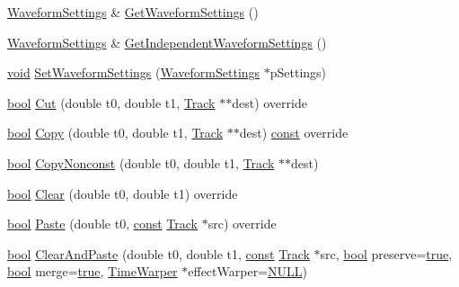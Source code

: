 \begin{DoxyCompactItemize}
\item 
\hyperlink{class_waveform_settings}{Waveform\+Settings} \& \hyperlink{class_wave_track_aa26938c5028c13c0811e68e19ef89274}{Get\+Waveform\+Settings} ()
\item 
\hyperlink{class_waveform_settings}{Waveform\+Settings} \& \hyperlink{class_wave_track_aec6387c49dc73248ebc0d2b250e746cd}{Get\+Independent\+Waveform\+Settings} ()
\item 
\hyperlink{sound_8c_ae35f5844602719cf66324f4de2a658b3}{void} \hyperlink{class_wave_track_aa07485811d9d93644345e7e2bec9d56e}{Set\+Waveform\+Settings} (\hyperlink{class_waveform_settings}{Waveform\+Settings} $\ast$p\+Settings)
\item 
\hyperlink{mac_2config_2i386_2lib-src_2libsoxr_2soxr-config_8h_abb452686968e48b67397da5f97445f5b}{bool} \hyperlink{class_wave_track_ab3baf9ac8b43075bf65786bdf42fba85}{Cut} (double t0, double t1, \hyperlink{class_track}{Track} $\ast$$\ast$dest) override
\item 
\hyperlink{mac_2config_2i386_2lib-src_2libsoxr_2soxr-config_8h_abb452686968e48b67397da5f97445f5b}{bool} \hyperlink{class_wave_track_a80d2c62c76195237b5412fa22aae8b46}{Copy} (double t0, double t1, \hyperlink{class_track}{Track} $\ast$$\ast$dest) \hyperlink{getopt1_8c_a2c212835823e3c54a8ab6d95c652660e}{const}  override
\item 
\hyperlink{mac_2config_2i386_2lib-src_2libsoxr_2soxr-config_8h_abb452686968e48b67397da5f97445f5b}{bool} \hyperlink{class_wave_track_afcccee2ff72be9519c5a096a423476ff}{Copy\+Nonconst} (double t0, double t1, \hyperlink{class_track}{Track} $\ast$$\ast$dest)
\item 
\hyperlink{mac_2config_2i386_2lib-src_2libsoxr_2soxr-config_8h_abb452686968e48b67397da5f97445f5b}{bool} \hyperlink{class_wave_track_a0643176c8e3d2b4de917b002af73e0ea}{Clear} (double t0, double t1) override
\item 
\hyperlink{mac_2config_2i386_2lib-src_2libsoxr_2soxr-config_8h_abb452686968e48b67397da5f97445f5b}{bool} \hyperlink{class_wave_track_a98b8e8311e6b12bffd18a16b30302c8b}{Paste} (double t0, \hyperlink{getopt1_8c_a2c212835823e3c54a8ab6d95c652660e}{const} \hyperlink{class_track}{Track} $\ast$src) override
\item 
\hyperlink{mac_2config_2i386_2lib-src_2libsoxr_2soxr-config_8h_abb452686968e48b67397da5f97445f5b}{bool} \hyperlink{class_wave_track_a0eddcd7d1b35068c7369145a5d97ee17}{Clear\+And\+Paste} (double t0, double t1, \hyperlink{getopt1_8c_a2c212835823e3c54a8ab6d95c652660e}{const} \hyperlink{class_track}{Track} $\ast$src, \hyperlink{mac_2config_2i386_2lib-src_2libsoxr_2soxr-config_8h_abb452686968e48b67397da5f97445f5b}{bool} preserve=\hyperlink{mac_2config_2i386_2lib-src_2libsoxr_2soxr-config_8h_a41f9c5fb8b08eb5dc3edce4dcb37fee7}{true}, \hyperlink{mac_2config_2i386_2lib-src_2libsoxr_2soxr-config_8h_abb452686968e48b67397da5f97445f5b}{bool} merge=\hyperlink{mac_2config_2i386_2lib-src_2libsoxr_2soxr-config_8h_a41f9c5fb8b08eb5dc3edce4dcb37fee7}{true}, \hyperlink{class_time_warper}{Time\+Warper} $\ast$effect\+Warper=\hyperlink{px__mixer_8h_a070d2ce7b6bb7e5c05602aa8c308d0c4}{N\+U\+LL})
$$
\end{DoxyCompactItemize}
